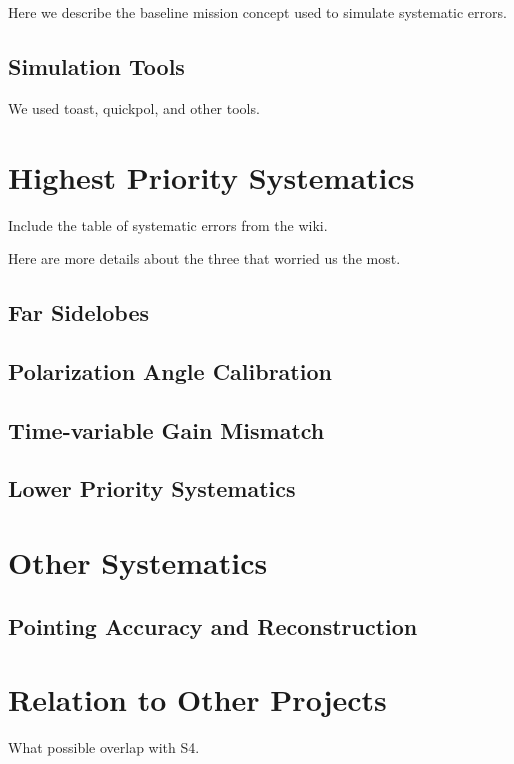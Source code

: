 \documentclass[12pt]{article}
\begin{document}
Here we describe the baseline mission concept used to simulate systematic errors.

\subsection{Simulation Tools}

We used toast, quickpol, and other tools.

\section{Highest Priority Systematics}

Include the table of systematic errors from the wiki.

Here are more details about the three that worried us the most.

\subsection{Far Sidelobes}

\subsection{Polarization Angle Calibration}

\subsection{Time-variable Gain Mismatch}

\subsection{Lower Priority Systematics}

\section{Other Systematics}

\subsection{Pointing Accuracy and Reconstruction}

\section{Relation to Other Projects}

What possible overlap with S4.

\newpage


\end{document}
